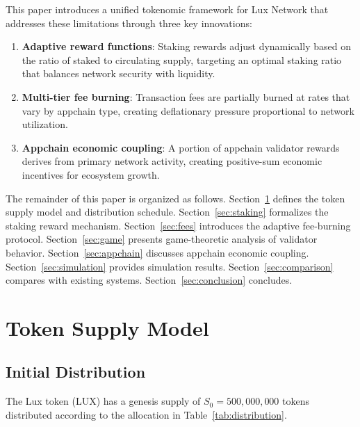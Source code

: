\documentclass[11pt,a4paper]{article}
\begin{document}
This paper introduces a unified tokenomic framework for Lux Network that addresses these limitations through three key innovations:

\begin{enumerate}[label=(\roman*)]
    \item \textbf{Adaptive reward functions}: Staking rewards adjust dynamically based on the ratio of staked to circulating supply, targeting an optimal staking ratio that balances network security with liquidity.
    \item \textbf{Multi-tier fee burning}: Transaction fees are partially burned at rates that vary by appchain type, creating deflationary pressure proportional to network utilization.
    \item \textbf{Appchain economic coupling}: A portion of appchain validator rewards derives from primary network activity, creating positive-sum economic incentives for ecosystem growth.
\end{enumerate}

The remainder of this paper is organized as follows. Section~\ref{sec:supply} defines the token supply model and distribution schedule. Section~\ref{sec:staking} formalizes the staking reward mechanism. Section~\ref{sec:fees} introduces the adaptive fee-burning protocol. Section~\ref{sec:game} presents game-theoretic analysis of validator behavior. Section~\ref{sec:appchain} discusses appchain economic coupling. Section~\ref{sec:simulation} provides simulation results. Section~\ref{sec:comparison} compares with existing systems. Section~\ref{sec:conclusion} concludes.

\section{Token Supply Model}\label{sec:supply}

\subsection{Initial Distribution}

The Lux token (LUX) has a genesis supply of $S_0 = 500{,}000{,}000$ tokens distributed according to the allocation in Table~\ref{tab:distribution}.
\end{document}
